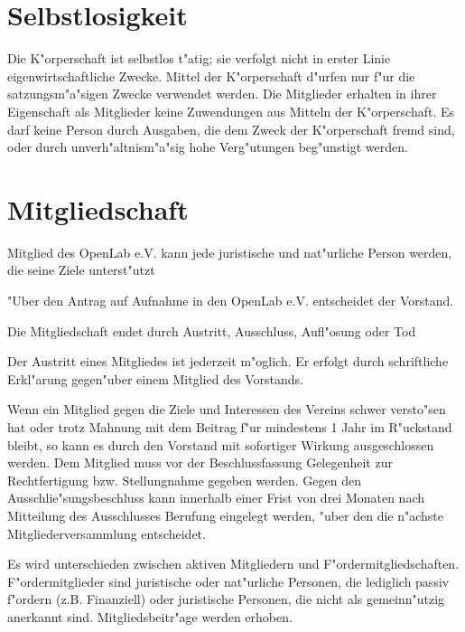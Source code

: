 \documentclass[a5paper, ngerman, 10pt]{scrreprt}
\begin{document}
\section{Selbstlosigkeit}
Die K"orperschaft ist selbstlos t"atig; sie verfolgt nicht in erster Linie
eigenwirtschaftliche Zwecke. Mittel der K"orperschaft d"urfen nur f"ur die
satzungsm"a"sigen Zwecke verwendet werden. Die Mitglieder erhalten in ihrer
Eigenschaft als Mitglieder keine Zuwendungen aus Mitteln der K"orperschaft. Es
darf keine Person durch Ausgaben, die dem Zweck der K"orperschaft fremd sind,
oder durch unverh"altnism"a"sig hohe Verg"utungen beg"unstigt werden.


\section{Mitgliedschaft}
\begin{compactenum}[(1)]
    \item Mitglied des OpenLab e.V. kann jede juristische und nat"urliche Person
        werden, die seine Ziele unterst"utzt
    \item "Uber den Antrag auf Aufnahme in den OpenLab e.V. entscheidet der
        Vorstand.
    \item Die Mitgliedschaft endet durch Austritt, Ausschluss, Aufl"osung oder
        Tod
    \item Der Austritt eines Mitgliedes ist jederzeit m"oglich. Er erfolgt durch
        schriftliche Erkl"arung gegen"uber einem Mitglied des Vorstands.
    \item Wenn ein Mitglied gegen die Ziele und Interessen des Vereins schwer
        versto"sen hat oder trotz Mahnung mit dem Beitrag f"ur mindestens 1 Jahr
        im R"uckstand bleibt, so kann es durch den Vorstand mit sofortiger
        Wirkung ausgeschlossen werden. Dem Mitglied muss vor der
        Beschlussfassung Gelegenheit zur Rechtfertigung bzw. Stellungnahme
        gegeben werden. Gegen den Ausschlie"sungsbeschluss kann innerhalb einer
        Frist von drei Monaten nach Mitteilung des Ausschlusses Berufung
        eingelegt werden, "uber den die n"achste Mitgliederversammlung
        entscheidet.
    \item Es wird unterschieden zwischen aktiven Mitgliedern und
        F"ordermitgliedschaften.  F"ordermitglieder sind juristische oder
        nat"urliche Personen, die lediglich passiv f"ordern (z.B. Finanziell)
        oder juristische Personen, die nicht als gemeinn"utzig anerkannt sind.
        Mitgliedsbeitr"age werden erhoben.
\end{compactenum}
\end{document}

